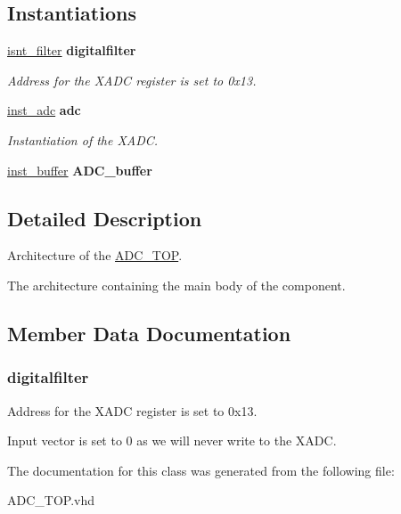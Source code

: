 \subsection*{Instantiations}
 \begin{DoxyCompactItemize}
\item 
\hyperlink{classADC__TOP_1_1Behavioral_a81c79629e96df5c724d8c3a91688a867}{isnt\-\_\-filter}  {\bfseries digitalfilter}   
\begin{DoxyCompactList}\small\item\em Address for the X\-A\-D\-C register is set to 0x13. \end{DoxyCompactList}\item 
\hypertarget{classADC__TOP_1_1Behavioral_ad035aeedbb36bd6303acc72526b48022}{\hyperlink{classADC__TOP_1_1Behavioral_ad035aeedbb36bd6303acc72526b48022}{inst\-\_\-adc}  {\bfseries adc}   }\label{classADC__TOP_1_1Behavioral_ad035aeedbb36bd6303acc72526b48022}

\begin{DoxyCompactList}\small\item\em Instantiation of the X\-A\-D\-C. \end{DoxyCompactList}\item 
\hypertarget{classADC__TOP_1_1Behavioral_adf88e6da5f53b3204a0fd1ba0ced2982}{\hyperlink{classADC__TOP_1_1Behavioral_adf88e6da5f53b3204a0fd1ba0ced2982}{inst\-\_\-buffer}  {\bfseries A\-D\-C\-\_\-buffer}   }\label{classADC__TOP_1_1Behavioral_adf88e6da5f53b3204a0fd1ba0ced2982}

\end{DoxyCompactItemize}


\subsection{Detailed Description}
Architecture of the \hyperlink{classADC__TOP}{A\-D\-C\-\_\-\-T\-O\-P}. 

The architecture containing the main body of the component. 

\subsection{Member Data Documentation}
\hypertarget{classADC__TOP_1_1Behavioral_a81c79629e96df5c724d8c3a91688a867}{
\subsubsection[{isnt\-\_\-filter}]{ {\bfseries \textcolor{vhdlchar}{digitalfilter}\textcolor{vhdlchar}{ }} \hspace{0.3cm}{\ttfamily [Instantiation]}}}\label{classADC__TOP_1_1Behavioral_a81c79629e96df5c724d8c3a91688a867}


Address for the X\-A\-D\-C register is set to 0x13. 

Input vector is set to 0 as we will never write to the X\-A\-D\-C. 

The documentation for this class was generated from the following file\-:\begin{DoxyCompactItemize}
\item 
A\-D\-C\-\_\-\-T\-O\-P.\-vhd\end{DoxyCompactItemize}
